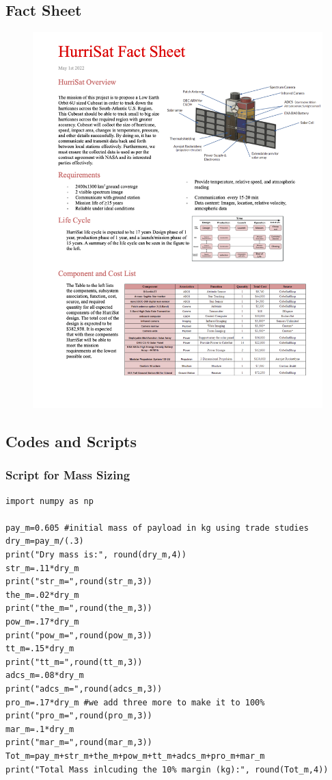 \subsection{Fact Sheet}
\begin{figure}[hbt!]
    \centering
    \includegraphics[width=\textwidth,frame]{Images/FactSheetHurriSat.png}
    \label{fig:Fact}
\end{figure}
\newpage
\subsection{Codes and Scripts} \label{codes}
\subsubsection{Script for Mass Sizing}
\begin{verbatim}
import numpy as np

pay_m=0.605 #initial mass of payload in kg using trade studies
dry_m=pay_m/(.3)
print("Dry mass is:", round(dry_m,4))
str_m=.11*dry_m
print("str_m=",round(str_m,3))
the_m=.02*dry_m
print("the_m=",round(the_m,3))
pow_m=.17*dry_m
print("pow_m=",round(pow_m,3))
tt_m=.15*dry_m
print("tt_m=",round(tt_m,3))
adcs_m=.08*dry_m
print("adcs_m=",round(adcs_m,3))
pro_m=.17*dry_m #we add three more to make it to 100%
print("pro_m=",round(pro_m,3))
mar_m=.1*dry_m
print("mar_m=",round(mar_m,3))
Tot_m=pay_m+str_m+the_m+pow_m+tt_m+adcs_m+pro_m+mar_m
print("Total Mass inlcuding the 10% margin (kg):", round(Tot_m,4))
\end{verbatim}

